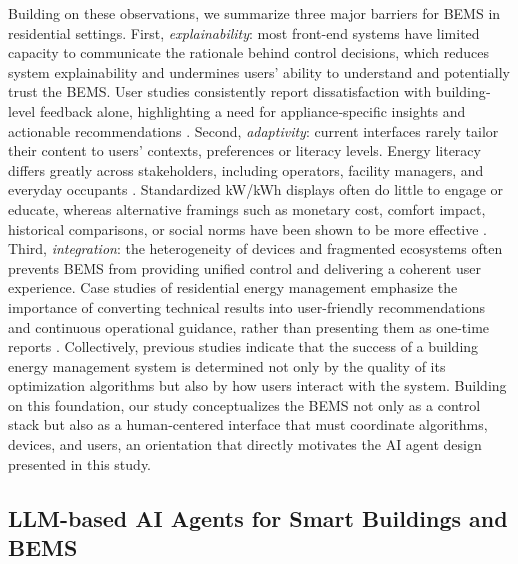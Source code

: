 \documentclass[final,3p,times]{elsarticle}
\begin{document}
Building on these observations, we summarize three major barriers for BEMS in residential settings. First, \textit{explainability}: most front-end systems have limited capacity to communicate the rationale behind control decisions, which reduces system explainability and undermines users’ ability to understand and potentially trust the BEMS. User studies consistently report dissatisfaction with building‐level feedback alone, highlighting a need for appliance‐specific insights and actionable recommendations \cite{nilsson2018smart}. Second, \textit{adaptivity}: current interfaces rarely tailor their content to users’ contexts, preferences or literacy levels. Energy literacy differs greatly across stakeholders, including operators, facility managers, and everyday occupants \cite{schwartz2015people}. Standardized kW/kWh displays often do little to engage or educate, whereas alternative framings such as monetary cost, comfort impact, historical comparisons, or social norms have been shown to be more effective \cite{buchanan2015question,nilsson2018smart}. Third, \textit{integration}: the heterogeneity of devices and fragmented ecosystems often prevents BEMS from providing unified control and delivering a coherent user experience. Case studies of residential energy management emphasize the importance of converting technical results into user-friendly recommendations and continuous operational guidance, rather than presenting them as one-time reports \cite{li2014insight, leitao2020survey}. Collectively, previous studies indicate that the success of a building energy management system is determined not only by the quality of its optimization algorithms but also by how users interact with the system. Building on this foundation, our study conceptualizes the BEMS not only as a control stack but also as a human‐centered interface that must coordinate algorithms, devices, and users, an orientation that directly motivates the AI agent design presented in this study.

\subsection{LLM-based AI Agents for Smart Buildings and BEMS}
\end{document}
